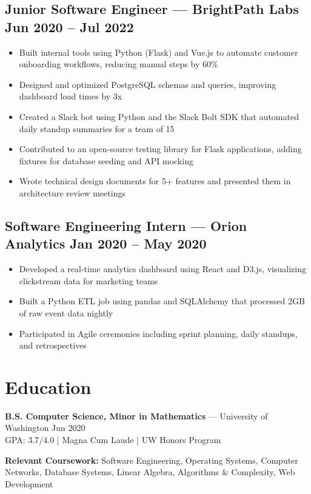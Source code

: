 \documentclass[11pt,a4paper]{article}
\begin{document}
\subsection*{Junior Software Engineer --- BrightPath Labs \hfill Jun 2020 -- Jul 2022}
\begin{itemize}[leftmargin=*]
  \item Built internal tools using Python (Flask) and Vue.js to automate customer onboarding workflows, reducing manual steps by 60\%
  \item Designed and optimized PostgreSQL schemas and queries, improving dashboard load times by 3x
  \item Created a Slack bot using Python and the Slack Bolt SDK that automated daily standup summaries for a team of 15
  \item Contributed to an open-source testing library for Flask applications, adding fixtures for database seeding and API mocking
  \item Wrote technical design documents for 5+ features and presented them in architecture review meetings
\end{itemize}

\subsection*{Software Engineering Intern --- Orion Analytics \hfill Jan 2020 -- May 2020}
\begin{itemize}[leftmargin=*]
  \item Developed a real-time analytics dashboard using React and D3.js, visualizing clickstream data for marketing teams
  \item Built a Python ETL job using pandas and SQLAlchemy that processed 2GB of raw event data nightly
  \item Participated in Agile ceremonies including sprint planning, daily standups, and retrospectives
\end{itemize}

\section*{Education}
\textbf{B.S. Computer Science, Minor in Mathematics} --- University of Washington \hfill Jun 2020 \\
GPA: 3.7/4.0 | Magna Cum Laude | UW Honors Program

\textbf{Relevant Coursework:} Software Engineering, Operating Systems, Computer Networks, Database Systems, Linear Algebra, Algorithms \& Complexity, Web Development
\end{document}
